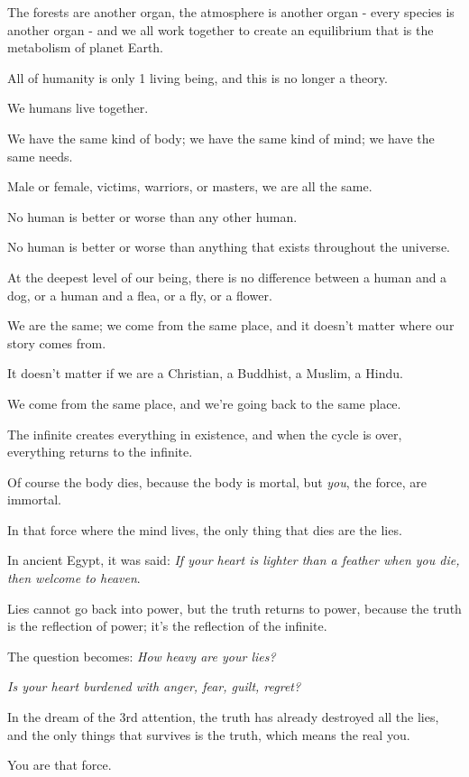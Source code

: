 \documentclass{article}
\numberwithin{equation}{section}
\begin{document}
The forests are another organ, the atmosphere is another organ - every species is another organ - and we all work together to create an equilibrium that is the metabolism of planet Earth.

%
All of humanity is only 1 living being, and this is no longer a theory.

We humans live together.

We have the same kind of body; we have the same kind of mind; we have the same needs.

Male or female, victims, warriors, or masters, we are all the same.

No human is better or worse than any other human.

No human is better or worse than anything that exists throughout the universe.

At the deepest level of our being, there is no difference between a human and a dog, or a human and a flea, or a fly, or a flower.

We are the same; we come from the same place, and it doesn't matter where our story comes from.

It doesn't matter if we are a Christian, a Buddhist, a Muslim, a Hindu.

We come from the same place, and we're going back to the same place.

%
The infinite creates everything in existence, and when the cycle is over, everything returns to the infinite.

Of course the body dies, because the body is mortal, but \textit{you}, the force, are immortal.

In that force where the mind lives, the only thing that dies are the lies.

In ancient Egypt, it was said: \textit{If your heart is lighter than a feather when you die, then welcome to heaven}.

Lies cannot go back into power, but the truth returns to power, because the truth is the reflection of power; it's the reflection of the infinite.

The question becomes: \textit{How heavy are your lies?}

\textit{Is your heart burdened with anger, fear, guilt, regret?}

%
In the dream of the 3rd attention, the truth has already destroyed all the lies, and the only things that survives is the truth, which means the real you.

You are that force.
\end{document}
